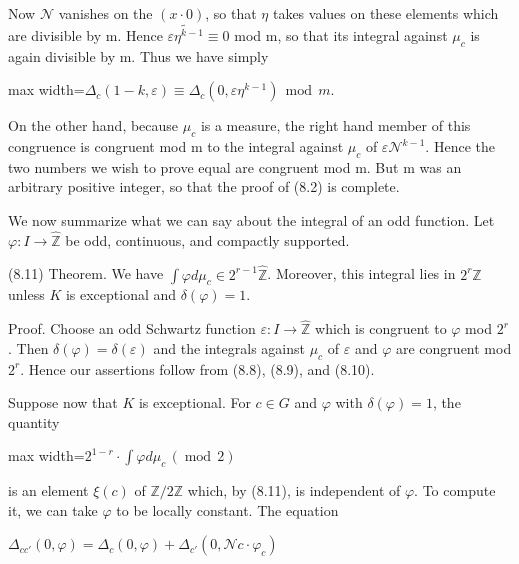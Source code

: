 \documentclass[11pt]{article}
\newcommand{\DFormula}[1]{\par\smallskip\noindent\begin{adjustbox}{max width=\linewidth}$\displaystyle #1$\end{adjustbox}\par\smallskip}
\begin{document}
Now \(\mathcal{N}\) vanishes on the \((x\cdot 0)\), so that \(\eta \) takes values on these elements which are divisible by m. Hence \(\widetilde{\varepsilon \eta ^{k-1}}\equiv 0\) mod m, so that its integral against \(\mu _{c}\) is again divisible by m. Thus we have simply\par
\par
\DFormula{\Delta _{c}(1-k,\varepsilon )\equiv \Delta _{c}(0,\varepsilon \eta ^{k-1})\,\operatorname{mod}\,m.}
\par
On the other hand, because \(\mu _{c}\) is a measure, the right hand member of this congruence is congruent mod m to the integral against \(\mu _{c}\) of \(\varepsilon \mathcal{N}^{k-1}\). Hence the two numbers we wish to prove equal are congruent mod m. But m was an arbitrary positive integer, so that the proof of (8.2) is complete.\par
\par
We now summarize what we can say about the integral of an odd function. Let \(\varphi :I\to \widehat{\mathbb{Z}}\) be odd, continuous, and compactly supported.\par
\par
(8.11) Theorem. We have \(\int \varphi d\mu _{c}\in 2^{r-1}\widehat{\mathbb{Z}}\). Moreover, this integral lies in \(2^{r}\widehat{\mathbb{Z}}\) unless \(K\) is exceptional and \(\delta (\varphi )=1\).\par
\par
Proof. Choose an odd Schwartz function \(\varepsilon :I\to \widehat{\mathbb{Z}}\) which is congruent to \(\varphi \) mod \(2^{r}\). Then \(\delta (\varphi )=\delta (\varepsilon )\) and the integrals against \(\mu _{c}\) of \(\varepsilon \) and \(\varphi \) are congruent mod \(2^{r}\). Hence our assertions follow from (8.8), (8.9), and (8.10).\par
\par
Suppose now that \(K\) is exceptional. For \(c\in G\) and \(\varphi \) with \(\delta (\varphi )=1\), the quantity\par
\par
\DFormula{2^{1-r}\cdot \int \varphi d\mu _{c}\,(\operatorname{mod}\,2)}
\par
is an element \(\xi (c)\) of \(\mathbb{Z}/2\mathbb{Z}\) which, by (8.11), is independent of \(\varphi \). To compute it, we can take \(\varphi \) to be locally constant. The equation\par
\par
\(\Delta _{cc'}(0,\varphi )=\Delta _{c}(0,\varphi )+\Delta _{c'}(0,\mathcal{N}c\cdot \varphi _{c})\)\par
\end{document}
